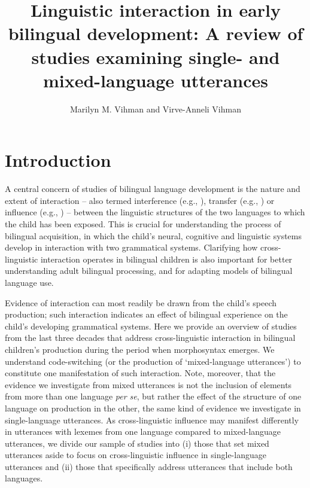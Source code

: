 \documentclass[output=paper]{langscibook}
\author{Marilyn M. Vihman\orcid{}\affiliation{University of York (Language and Linguistic Science), UK; University of California, Berkeley (Linguistics), US} and Virve-Anneli Vihman\orcid{}\affiliation{University of Tartu, Estonia}}
\title[Linguistic interaction in early bilingual development]{Linguistic interaction in early bilingual development: A review of studies examining single- and mixed-language utterances}
\begin{document}
\maketitle


\section{Introduction}

A central concern of studies of bilingual language development is the nature and extent of interaction – also termed interference (e.g., \citealt{ParadisNavarro2003}), transfer (e.g., \citealt{YipMatthews2000}) or influence (e.g., \citealt{Serratrice2013}) – between the linguistic structures of the two languages to which the child has been exposed. This is crucial for understanding the process of bilingual acquisition, in which the child’s neural, cognitive and linguistic systems develop in interaction with two grammatical systems. Clarifying how cross-linguistic interaction operates in bilingual children is also important for better understanding adult bilingual processing, and for adapting models of bilingual language use.

Evidence of interaction can most readily be drawn from the child’s speech production; such interaction indicates an effect of bilingual experience on the child's developing grammatical systems. Here we provide an overview of studies from the last three decades that address cross-linguistic interaction in bilingual children’s production during the period when morphosyntax emerges. We understand code-switching (or the production of ‘mixed-language utterances’) to constitute one manifestation of such interaction. Note, moreover, that the evidence we investigate from mixed utterances is not the inclusion of elements from more than one language \textit{per se}, but rather the effect of the structure of one language on production in the other, the same kind of evidence we investigate in single-language utterances. As cross-linguistic influence may manifest differently in utterances with lexemes from one language compared to mixed-language utterances, we divide our sample of studies into (i) those that set mixed utterances aside to focus on cross-linguistic influence in single-language utterances and (ii) those that specifically address utterances that include both languages.
\end{document}
